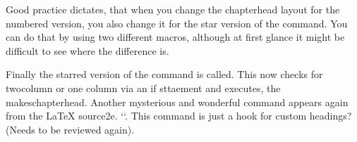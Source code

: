 
\begin{teXXX}
\def\@chapter[#1]#2{\ifnum \c@secnumdepth >\m@ne
                       \if@mainmatter
                         \refstepcounter{chapter}%
                         \typeout{\@chapapp\space\thechapter.}%
                         \addcontentsline{toc}{chapter}%
                                   {\protect\numberline{\thechapter}#1}%
                       \else
                         \addcontentsline{toc}{chapter}{#1}%
                       \fi
                    \else
                      \addcontentsline{toc}{chapter}{#1}%
                    \fi
                    \chaptermark{#1}%
                    \addtocontents{lof}{\protect\addvspace{10\p@}}%
                    \addtocontents{lot}{\protect\addvspace{10\p@}}%
                    \if@twocolumn
                      \@topnewpage[\@makechapterhead{#2}]%
                    \else
                      \@makechapterhead{#2}%
                      \@afterheading
                    \fi}
\end{teXXX}

\begin{multicols}{2}

Good practice dictates, that when you change the chapterhead layout for the numbered version, you also change it for the star version of the command. You can do that by using two different macros, although at first glance it might be difficult to see where the difference is.
\end{multicols}


\begin{teXXX}
\def\@makechapterhead
\def\@makeschapterhead
\end{teXXX}

\begin{teXXX}
\def\@makechapterhead#1{%
  \vspace*{50\p@}%
  {\parindent \z@ \raggedright \normalfont
    \ifnum \c@secnumdepth >\m@ne
      \if@mainmatter
        \huge\bfseries \@chapapp\space \thechapter
        \par\nobreak
        \vskip 20\p@
      \fi
    \fi
    \interlinepenalty\@M
    \Huge \bfseries #1\par\nobreak
    \vskip 40\p@
  }}
\end{teXXX}

\begin{multicols}{2}
Finally the starred version of the command is called. This now checks for twocolumn or one column via an if sttaement and executes, the makeschapterhead. Another mysterious and wonderful command appears again from the LaTeX source2e. `\@afterheading`. This command 
is just a hook for custom headings? (Needs to be reviewed again).
\end{multicols}

